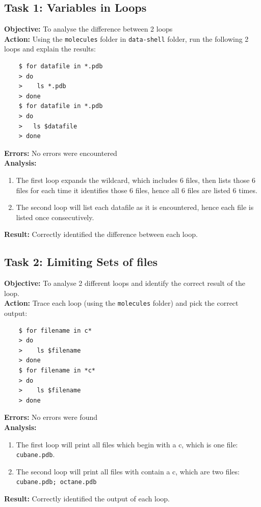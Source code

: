 \documentclass{article}
\begin{document}
\subsection{Task 1: Variables in Loops}
%
\textbf{Objective:} To analyse the difference between 2 loops\\
\textbf{Action:} Using the \texttt{molecules} folder in \texttt{data-shell} folder, run the following 2 loops and explain the results:
\begin{verbatim}
    $ for datafile in *.pdb
    > do
    >    ls *.pdb
    > done
    $ for datafile in *.pdb
    > do
    >	ls $datafile
    > done
\end{verbatim}
\textbf{Errors:} No errors were encountered\\
\textbf{Analysis:}
\begin{enumerate}
    \item The first loop expands the wildcard, which includes 6 files, then lists those 6 files for each time it identifies those 6 files, hence all 6 files are listed 6 times.
    \item The second loop will list each datafile as it is encountered, hence each file is listed once consecutively.
\end{enumerate}
\textbf{Result:} Correctly identified the difference between each loop.
%
\subsection{Task 2: Limiting Sets of files}
%
\textbf{Objective:} To analyse 2 different loops and identify the correct result of the loop.\\
\textbf{Action:} Trace each loop (using the \texttt{molecules} folder) and pick the correct output:
\begin{verbatim}
    $ for filename in c*
    > do
    >    ls $filename
    > done
    $ for filename in *c*
    > do
    >    ls $filename
    > done
\end{verbatim}
\textbf{Errors:} No errors were found\\
\textbf{Analysis:}
\begin{enumerate}
    \item The first loop will print all files which begin with a c, which is one file: \texttt{cubane.pdb}.
    \item The second loop will print all files with contain a c, which are two files: \texttt{cubane.pdb; octane.pdb}
\end{enumerate}
\textbf{Result:} Correctly identified the output of each loop.
%
\end{document}
